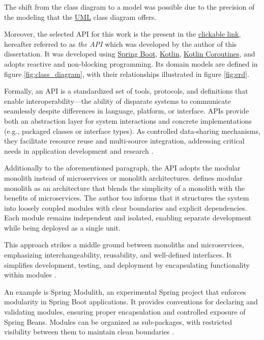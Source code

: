 The shift from the class diagram to a model was possible due to the precision of the modeling that the \hyperref[appendix:glossary]{UML} class diagram offers.

Moreover, the selected API for this work is the present in the \href{https://github.com/LazaroDamasceno/Reactive-Medical-Appointments-Management-API-In-Kotlin-V2.git}{clickable link}, hereafter referred to as \textit{the API} which was developed by the author of this dissertation. It was developed using  \hyperref[appendix:glossary]{Spring Boot}, \hyperref[appendix:glossary]{Kotlin}, \hyperref[appendix:glossary]{Kotlin Coroutines}, and adopts reactive and non-blocking programming. Its domain models are defined in figure \ref{fig:class_diagram}, with their relationships illustrated in figure \ref{fig:erd}.

Formally, an API is a standardized set of tools, protocols, and definitions that enable interoperability—the ability of disparate systems to communicate seamlessly despite differences in language, platform, or interface. APIs provide both an abstraction layer for system interactions and concrete implementations (e.g., packaged classes or interface types). As controlled data-sharing mechanisms, they facilitate resource reuse and multi-source integration, addressing critical needs in application development 
 and research 
 \cite{aksu2016visualization, dullabh2020application, hussain2020enterprise, matilainen2011multicore, mcguire2013publisher, 
 swaminathan2016review, wegner1996}.

Additionally to the aforementioned paragraph, the API adopts the modular monolith instead of microservices or monolith architectures. 
\cite{su2024modular} defines modular monolith as an architecture that blends the simplicity of a monolith with the benefits of microservices. The author too informs that it structures the system into loosely coupled modules with clear boundaries and explicit dependencies. Each module remains independent and isolated, enabling separate development while being deployed as a single unit.

This approach strikes a middle ground between monoliths and microservices, emphasizing interchangeability, reusability, and well-defined interfaces. It simplifies development, testing, and deployment by encapsulating functionality within modules \cite{su2024modular}.

An example is Spring Modulith, an experimental Spring project that enforces modularity in Spring Boot applications. It provides conventions for declaring and validating modules, ensuring proper encapsulation and controlled exposure of Spring Beans. Modules can be organized as sub-packages, with restricted visibility between them to maintain clean boundaries \cite{su2024modular}.

